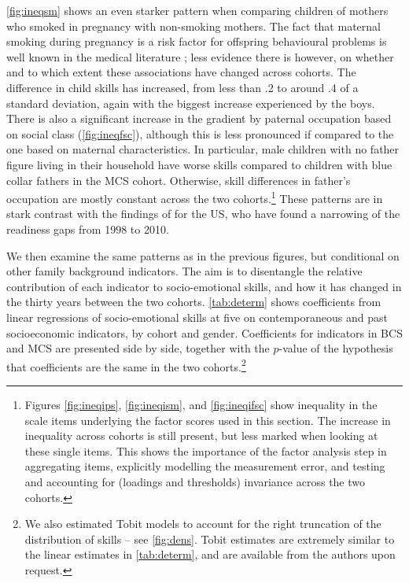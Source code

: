 \autoref{fig:ineqsm} shows an even starker pattern when comparing children of mothers who smoked in pregnancy with non-smoking mothers. The fact that maternal smoking during pregnancy is a risk factor for offspring behavioural problems is well known in the medical literature \citep{gaysina2013maternal}; less evidence there is however, on whether and to which extent these associations have changed across cohorts. The difference in child skills has increased, from less than .2 to around .4 of a standard deviation, again with the biggest increase experienced by the boys. There is also a significant increase in the gradient by paternal occupation based on social class (\autoref{fig:ineqfsc}), although this is less pronounced if compared to the one based on maternal characteristics. In particular, male children with no father figure living in their household have worse skills compared to children with blue collar fathers in the MCS cohort. Otherwise, skill differences in father's occupation are mostly constant across the two cohorts.\footnote{Figures \ref{fig:ineqips}, \ref{fig:ineqism}, and \ref{fig:ineqifsc} show inequality in the scale items underlying the factor scores used in this section. The increase in inequality across cohorts is still present, but less marked when looking at these single items. This shows the importance of the factor analysis step in aggregating items, explicitly modelling the measurement error, and testing and accounting for (loadings and thresholds) invariance across the two cohorts.} These patterns are in stark contrast with the findings of \citet{reardon2016recent} for the US, who have found a narrowing of the readiness gaps from 1998 to 2010.

We then examine the same patterns as in the previous figures, but conditional on other family background indicators. The aim is to disentangle the relative contribution of each indicator to socio-emotional skills, and how it has changed in the thirty years between the two cohorts. \autoref{tab:determ} shows coefficients from linear regressions of socio-emotional skills at five on contemporaneous and past socioeconomic indicators, by cohort and gender. Coefficients for indicators in BCS and MCS are presented side by side, together with the $p$-value of the hypothesis that coefficients are the same in the two cohorts.\footnote{We also estimated Tobit models to account for the right truncation of the distribution of skills -- see \autoref{fig:dens}. Tobit estimates are extremely similar to the linear estimates in \autoref{tab:determ}, and are available from the authors upon request.}

